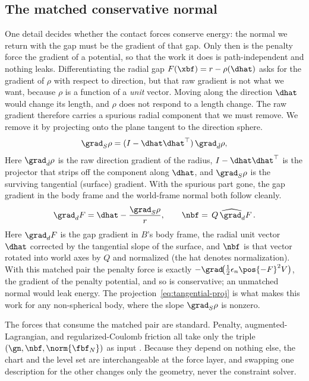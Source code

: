 \subsection{The matched conservative normal}\label{sec:tmap:matched}

One detail decides whether the contact forces conserve energy: the normal we return with the gap must be
the gradient of that gap. Only then is the penalty force the gradient of a potential, so that the work it
does is path-independent and nothing leaks. Differentiating the radial gap $F(\xbf)=r-\rho(\dhat)$ asks
for the gradient of $\rho$ with respect to direction, but that raw gradient is not what we want, because
$\rho$ is a function of a \emph{unit} vector. Moving along the direction $\dhat$ would change its length,
and $\rho$ does not respond to a length change. The raw gradient therefore carries a spurious
radial component that we must remove. We remove it by projecting onto the plane tangent to the direction
sphere.
%
\begin{equation}\label{eq:tangential-proj}
\grad_S\rho=(I-\dhat\dhat^\top)\,\grad_{\hat d}\rho,
\end{equation}
%
Here $\grad_{\hat d}\rho$ is the raw direction gradient of the radius, $I-\dhat\dhat^\top$ is the
projector that strips off the component along $\dhat$, and $\grad_S\rho$ is the surviving tangential
(surface) gradient. With the spurious part gone, the gap gradient in the body frame and the world-frame
normal both follow cleanly.
%
\begin{equation}\label{eq:matched-normal}
\grad_d F=\dhat-\frac{\grad_S\rho}{r},\qquad
\nbf=\widehat{\,Q\,\grad_d F\,}.
\end{equation}
%
Here $\grad_d F$ is the gap gradient in $B$'s body frame, the radial unit vector $\dhat$ corrected by the
tangential slope of the surface, and $\nbf$ is that vector rotated into world axes by $Q$ and normalized
(the hat denotes normalization). With this matched pair the penalty force is exactly
$-\grad\!\big(\tfrac12\epsilon_n\pos{-F}^2 V\big)$, the gradient of the penalty potential, and so is
conservative; an unmatched normal would leak energy. The projection~\eqref{eq:tangential-proj} is what
makes this work for any non-spherical body, where the slope $\grad_S\rho$ is nonzero.

The forces that consume the matched pair are standard. Penalty, augmented-Lagrangian, and
regularized-Coulomb friction all take only the triple $(\gn,\nbf,\norm{\fbf_N})$ as input
\citep{wriggers2006computational,kikuchi1988contact,laursen2002computational,alart1991mixed,simo1992augmented}.
Because they depend on nothing else, the chart and the level set are interchangeable at the force layer,
and swapping one description for the other changes only the geometry, never the constraint solver.

